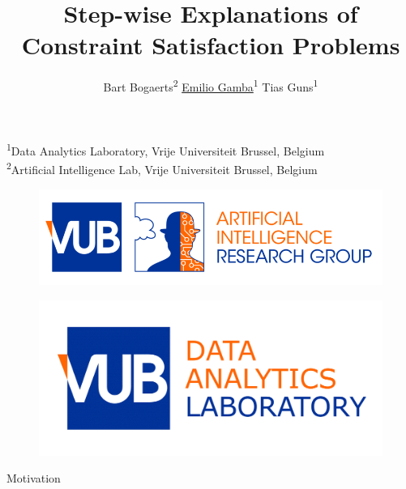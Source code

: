 \documentclass{beamer}
\title{Step-wise Explanations of Constraint Satisfaction Problems}
\author{ Bart Bogaerts\textsuperscript{2}  \hspace{0.5cm}\underline{Emilio Gamba}\textsuperscript{1} \hspace{0.5cm} Tias Guns\textsuperscript{1}}
\date{}
\begin{document}
\begin{frame}
    \maketitle
    \vspace{-2.5cm}
    \begin{center}
        {\small\textsuperscript{1}Data Analytics Laboratory, Vrije Universiteit Brussel, Belgium\\
            \textsuperscript{2}Artificial Intelligence Lab, Vrije Universiteit Brussel, Belgium}
    \end{center}

    \begin{minipage}[t]{0.48\linewidth}
        \centering
        \vspace{0.1cm}
        \begin{figure}[h]
            \includegraphics[width=\textwidth]{VUB-AI_RGB-1-800x223.png}
            \label{vub-logo}
        \end{figure}
    \end{minipage}\hfill
    \begin{minipage}[t]{0.48\linewidth}
        \centering
        \begin{figure}[h]
            \includegraphics[width=.68\textwidth]{figures/datalab}
            \label{vub-logo}
        \end{figure}

    \end{minipage}

\end{frame}


\begin{frame}{Motivation}
   
\end{frame}
\end{document}
